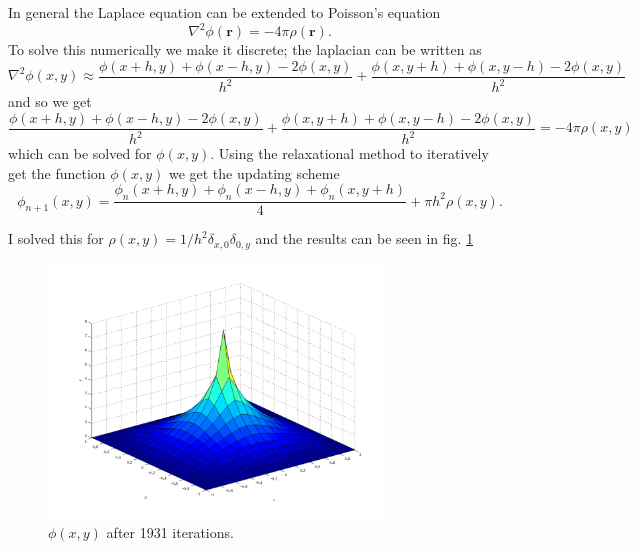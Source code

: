 \FloatBarrier
In general the Laplace equation can be extended to Poisson's equation
\begin{equation}
\nabla^2\phi(\mathbf{r}) = -4\pi \rho(\mathbf{r}).
\label{eq:exc1_poisson}
\end{equation}
To solve this numerically we make it discrete; the laplacian can be written as
\[
\nabla^2 \phi(x,y) \approx \frac{\phi(x+h,y)+\phi(x-h,y)-2\phi(x,y)}{h^2} + \frac{\phi(x,y+h)+\phi(x,y-h)-2\phi(x,y)}{h^2}
\]
and so we get
\[
\frac{\phi(x+h,y)+\phi(x-h,y)-2\phi(x,y)}{h^2} + \frac{\phi(x,y+h)+\phi(x,y-h)-2\phi(x,y)}{h^2} = -4 \pi \rho(x,y)
\]
which can be solved for $\phi(x,y)$. Using the relaxational method to iteratively get the function $\phi(x,y)$ we get the updating scheme
\begin{equation}
\phi_{n+1}(x,y) = \frac{\phi_n(x+h,y)+\phi_n(x-h,y)+\phi_n(x,y+h)}{4} + \pi h^2 \rho(x,y).
\end{equation}

I solved this for $\rho(x,y) = 1/h^2 \delta_{x,0}\delta_{0,y}$ and the results can be seen in fig. \ref{fig:exc1_poisson}
\begin{figure}[h!]
	\centering
	\includegraphics[width=0.8\textwidth]{img/exc1_poisson}
	\caption{$\phi(x,y)$ after 1931 iterations.}
	\label{fig:exc1_poisson}
\end{figure}